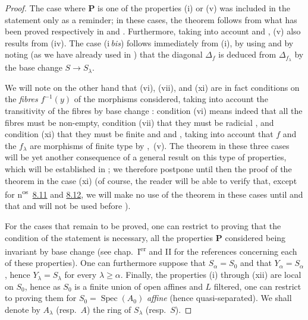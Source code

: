 \begin{proof}
The case where $\mathbf{P}$ is one of the properties (i) or (v) was included in the statement only as a reminder; in these cases, the theorem follows from what has been proved respectively in  and .
Furthermore, taking into account  and , (v) also results from (iv).
The case (i\,\emph{bis}) follows immediately from (i), by using  and by noting (as we have already used in ) that the diagonal $\Delta_f$ is deduced from $\Delta_{f_\lambda}$ by the base change $S\to S_\lambda$.

We will note on the other hand that (vi), (vii), and (xi) are in fact conditions on the \emph{fibres} $f^{-1}(y)$ of the morphisms considered, taking into account the transitivity of the fibres by base change : condition (vi) means indeed that all the fibres must be non-empty, condition (vii) that they must be radicial , and condition (xi) that they must be finite  and  and , taking into account that $f$ and the $f_\lambda$ are morphisms of finite type by ,~(v).
The theorem in these three cases will be yet another consequence of a general result on this type of properties, which will be established in ; we therefore postpone until then the proof of the theorem in the case (xi) (of course, the reader will be able to verify that, except for n\textsuperscript{os}~{\hyperref[IV.8.11]{8.11}} and {\hyperref[IV.8.12]{8.12}}, we will make no use of the theorem in these cases until  and that  and  will not be used before ).

For the cases that remain to be proved, one can restrict to proving that the condition of the statement is necessary, all the properties $\mathbf{P}$ considered being invariant by base change (see chap.~I\textsuperscript{er} and II for the references concerning each of these properties).
One can furthermore suppose that $S_\alpha=S_0$ and that $Y_\alpha=S_\alpha$, hence $Y_\lambda=S_\lambda$ for every $\lambda\geqslant\alpha$.
Finally, the properties (i) through (xii) are local on $S_0$, hence as $S_0$ is a finite union of open affines and $L$ filtered, one can restrict to proving them for $S_0=\operatorname{Spec}(A_0)$ \emph{affine} (hence quasi-separated).
We shall denote by $A_\lambda$ (resp.\ $A$) the ring of $S_\lambda$ (resp.\ $S$).


\end{proof}
